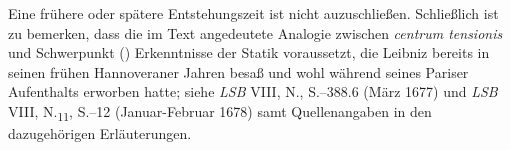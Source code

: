 Eine frühere oder spätere Entstehungszeit ist nicht auzuschließen.
\pend%
\pstart%
Schließlich ist zu bemerken, dass die im Text angedeutete Analogie zwischen \textit{centrum tensionis} und Schwerpunkt () Erkenntnisse der Statik voraussetzt, die Leibniz bereits in seinen frühen Hannoveraner Jahren besaß und wohl während seines Pariser Aufenthalts erworben hatte;
siehe \textit{LSB} VIII, N., S.--388.6 (März 1677)\cite{01488}
und \textit{LSB} VIII, N.\textsubscript{11}, S.--12\cite{01401} (Januar-Februar 1678)
samt Quellenangaben in den dazugehörigen Erläuterungen.%
\pend%
%
\frenchspacing%
\newpage%
